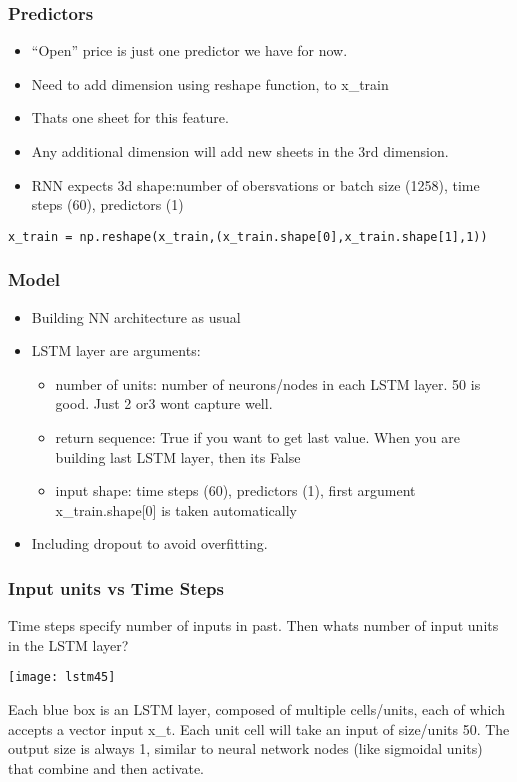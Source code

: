 \begin{frame}[fragile] \frametitle{Predictors}
\begin{itemize}
\item ``Open'' price is just one predictor we have for now.
\item Need to add  dimension using reshape function, to x\_train
\item Thats one sheet for this feature.
\item Any additional dimension will add new sheets in the 3rd dimension.
\item RNN expects 3d shape:number of obersvations or batch size (1258), time steps (60), predictors (1)
\end{itemize}

\begin{lstlisting}
x_train = np.reshape(x_train,(x_train.shape[0],x_train.shape[1],1))
\end{lstlisting}
\end{frame}

\begin{frame}[fragile] \frametitle{Model}
\begin{itemize}
\item Building NN architecture as usual
\item LSTM layer are arguments:
\begin{itemize}
\item number of units: number of neurons/nodes in each LSTM layer. 50 is good. Just 2 or3 wont capture well.
\item return sequence: True if you want to get last value. When you are building last LSTM layer, then its False
\item input shape:  time steps (60), predictors (1), first argument x\_train.shape[0] is taken automatically
\end{itemize}
\item Including dropout to avoid overfitting.
\end{itemize}
\end{frame}



\begin{frame}[fragile] \frametitle{Input units vs Time Steps}
Time steps specify number of inputs in past. Then whats number of input units in the LSTM layer?
\begin{center}
\texttt{[image: lstm45]}
\end{center}
Each blue box is an LSTM layer, composed of multiple cells/units, each of which accepts a vector input x\_t. Each unit cell will take an input of size/units 50. The output size is always 1, similar to neural network nodes (like sigmoidal units) that combine and then activate.
\end{frame}


